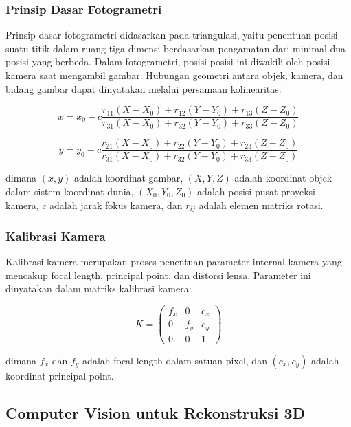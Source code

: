 \documentclass[12pt,a4paper]{article}
\begin{document}
\subsubsection{Prinsip Dasar Fotogrametri}

Prinsip dasar fotogrametri didasarkan pada triangulasi, yaitu penentuan posisi suatu titik dalam ruang tiga dimensi berdasarkan pengamatan dari minimal dua posisi yang berbeda. Dalam fotogrametri, posisi-posisi ini diwakili oleh posisi kamera saat mengambil gambar. Hubungan geometri antara objek, kamera, dan bidang gambar dapat dinyatakan melalui persamaan kolinearitas:

\begin{equation}
x = x_0 - c \frac{r_{11}(X-X_0) + r_{12}(Y-Y_0) + r_{13}(Z-Z_0)}{r_{31}(X-X_0) + r_{32}(Y-Y_0) + r_{33}(Z-Z_0)}
\end{equation}

\begin{equation}
y = y_0 - c \frac{r_{21}(X-X_0) + r_{22}(Y-Y_0) + r_{23}(Z-Z_0)}{r_{31}(X-X_0) + r_{32}(Y-Y_0) + r_{33}(Z-Z_0)}
\end{equation}

dimana $(x,y)$ adalah koordinat gambar, $(X,Y,Z)$ adalah koordinat objek dalam sistem koordinat dunia, $(X_0,Y_0,Z_0)$ adalah posisi pusat proyeksi kamera, $c$ adalah jarak fokus kamera, dan $r_{ij}$ adalah elemen matriks rotasi.

\subsubsection{Kalibrasi Kamera}

Kalibrasi kamera merupakan proses penentuan parameter internal kamera yang mencakup focal length, principal point, dan distorsi lensa. Parameter ini dinyatakan dalam matriks kalibrasi kamera:

\begin{equation}
K = \begin{pmatrix}
f_x & 0 & c_x \\
0 & f_y & c_y \\
0 & 0 & 1
\end{pmatrix}
\end{equation}

dimana $f_x$ dan $f_y$ adalah focal length dalam satuan pixel, dan $(c_x, c_y)$ adalah koordinat principal point.

\subsection{Computer Vision untuk Rekonstruksi 3D}
\end{document}
